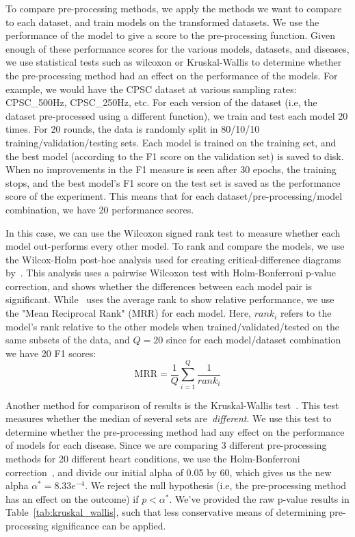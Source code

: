 \documentclass[pmlr,twocolumn]{jmlr}%
\begin{document}
To compare pre-processing methods, we apply the methods we want to compare to each dataset, and train models on the transformed datasets. We use the performance of the model to give a score to the pre-processing function. Given enough of these performance scores for the various models, datasets, and diseases, we use statistical tests such as wilcoxon or Kruskal-Wallis to determine whether the pre-processing method had an effect on the performance of the models. For example, we would have the CPSC dataset at various sampling rates: CPSC\_500Hz, CPSC\_250Hz, etc. For each version of the dataset (i.e, the dataset pre-processed using a different function), we train and test each model 20 times. For 20 rounds, the data is randomly split in 80/10/10 training/validation/testing sets. Each model is trained on the training set, and the best model (according to the F1 score on the validation set) is saved to disk. When no improvements in the F1 measure is seen after 30 epochs, the training stops, and the best model's F1 score on the test set is saved as the performance score of the experiment. This means that for each dataset/pre-processing/model combination, we have 20 performance scores. 

In this case, we can use the Wilcoxon signed rank test to measure whether each model out-performs every other model. To rank and compare the models, we use the Wilcox-Holm post-hoc analysis used for creating critical-difference diagrams by~\cite{IsmailFawaz2018deep}. This analysis uses a pairwise Wilcoxon test with Holm-Bonferroni p-value correction, and shows whether the differences between each model pair is significant. While~\cite{IsmailFawaz2018deep} uses the average rank to show relative performance, we use the "Mean Reciprocal Rank" (MRR) for each model. Here, $rank_i$ refers to the model's rank relative to the other models when trained/validated/tested on the same subsets of the data, and $Q=20$ since for each model/dataset combination we have 20 F1 scores:
\[ \text{MRR} = \frac{1}{Q}\sum_{i=1}^{Q}\frac{1}{rank_i} \]

Another method for comparison of results is the Kruskal-Wallis test~\cite{kruskal1952use,ostertagova2014methodology}. This test measures whether the median of several sets are~\textit{different}. We use this test to determine whether the pre-processing method had any effect on the performance of models for each disease. Since we are comparing 3 different pre-processing methods for 20 different heart conditions, we use the Holm-Bonferroni correction~\cite{holm1979simple,abdi2010holm}, and divide our initial alpha of 0.05 by 60, which gives us the new alpha $\alpha^*=8.33e^{-4}$. We reject the null hypothesis (i.e, the pre-processing method has an effect on the outcome) if $p<\alpha^*$. We've provided the raw p-value results in Table~\ref{tab:kruskal_wallis}, such that less conservative means of determining pre-processing significance can be applied.
\end{document}
